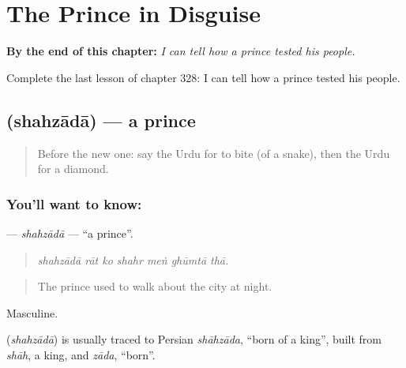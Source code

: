 
\chapter{The Prince in Disguise}
\label{ch:ur-the-prince-in-disguise}

\begin{chapteropening}
\textbf{By the end of this chapter:} \emph{I can tell how a prince tested his people.}

Complete the last lesson of chapter 328: I can tell how a prince tested his people.
\end{chapteropening}

\section[\texorpdfstring{\ur{شہزادہ} (shahzādā)}{شہزادہ (shahzādā)}]{ (shahzādā) — a prince}

\label{lesson:UR-C328-shahzada}



\begin{quote}
Before the new one: say the Urdu for to bite (of a snake), then the Urdu for a diamond.
\end{quote}

\subsection*{You'll want to know: }
\textbf{} — \emph{shahzādā} — \textquotedblleft{}a prince\textquotedblright{}.

\begin{quote}
      
\end{quote}

\begin{quote}
\emph{shahzādā rāt ko shahr meṅ ghūmtā thā.}
\end{quote}

\begin{quote}
The prince used to walk about the city at night.
\end{quote}

Masculine.

\begin{cousinweb}
\textbf{} (\emph{shahzādā}) is usually traced to Persian \emph{shāhzāda}, \textquotedblleft{}born of a king\textquotedblright{}, built from \emph{shāh}, a king, and \emph{zāda}, \textquotedblleft{}born\textquotedblright{}.
\end{cousinweb}

